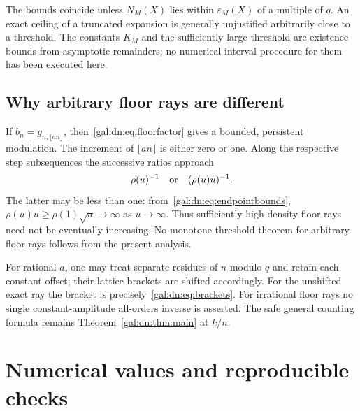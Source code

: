 \documentclass[11pt,letterpaper]{article}
\numberwithin{equation}{section}
\theoremstyle{definition}\newtheorem{definition}[theorem]{Definition}
\theoremstyle{remark}\newtheorem{remark}[theorem]{Remark}
\newcommand{\eps}{\varepsilon}
\begin{document}
The bounds coincide unless $N_M(X)$ lies within $\eps_M(X)$ of a multiple of $q$. An exact ceiling of a truncated expansion is generally unjustified arbitrarily close to a threshold. The constants $K_M$ and the sufficiently large threshold are existence bounds from asymptotic remainders; no numerical interval procedure for them has been executed here.

\subsection{Why arbitrary floor rays are different}
If $b_n=g_{n,\lfloor an\rfloor}$, then~\eqref{gal:dn:eq:floorfactor} gives a bounded, persistent modulation. The increment of $\lfloor an\rfloor$ is either zero or one. Along the respective step subsequences the successive ratios approach
\begin{equation}\label{gal:dn:eq:floorsteps}
 \rho(u)^{-1}\quad\hbox{or}\quad (\rho(u)u)^{-1}.
\end{equation}
The latter may be less than one: from~\eqref{gal:dn:eq:endpointbounds}, $\rho(u)u\geq\rho(1)\sqrt u\to\infty$ as $u\to\infty$. Thus sufficiently high-density floor rays need not be eventually increasing. No monotone threshold theorem for arbitrary floor rays follows from the present analysis.

For rational $a$, one may treat separate residues of $n$ modulo $q$ and retain each constant offset; their lattice brackets are shifted accordingly. For the unshifted exact ray the bracket is precisely~\eqref{gal:dn:eq:brackets}. For irrational floor rays no single constant-amplitude all-orders inverse is asserted. The safe general counting formula remains Theorem~\ref{gal:dn:thm:main} at $k/n$.

\section{Numerical values and reproducible checks}\label{gal:dn:sec:numerics}
\end{document}
